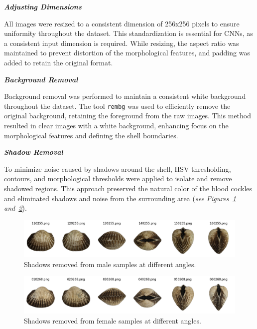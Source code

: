 \newpage
\textbf{\textit{Adjusting Dimensions}}

All images were resized to a consistent dimension of 256x256 pixels to ensure uniformity throughout the dataset. This standardization is essential for CNNs, as a consistent input dimension is required. While resizing, the aspect ratio was maintained to prevent distortion of the morphological features, and padding was added to retain the original format.

\textbf{\textit{Background Removal}}

Background removal was performed to maintain a consistent white background throughout the dataset. The tool \texttt{rembg} was used to efficiently remove the original background, retaining the foreground from the raw images. This method resulted in clear images with a white background, enhancing focus on the morphological features and defining the shell boundaries.

\textbf{\textit{Shadow Removal}}

To minimize noise caused by shadows around the shell, HSV thresholding, contours, and morphological thresholds were applied to isolate and remove shadowed regions. This approach preserved the natural color of the blood cockles and eliminated shadows and noise from the surrounding area (\textit{see Figures~\ref{fig:m_noshadow} and~\ref{fig:f_noshadow}}).

\begin{figure}[h]
	\centering
	\includegraphics[width=\textwidth]{figures/male_shadows_removed.png}
	\caption{Shadows removed from male samples at different angles.}
	\label{fig:m_noshadow}
\end{figure}

\begin{figure}[h]
	\centering
	\includegraphics[width=\textwidth]{figures/female_shadows_removed.png}
	\caption{Shadows removed from female samples at different angles.}
	\label{fig:f_noshadow}
\end{figure}


